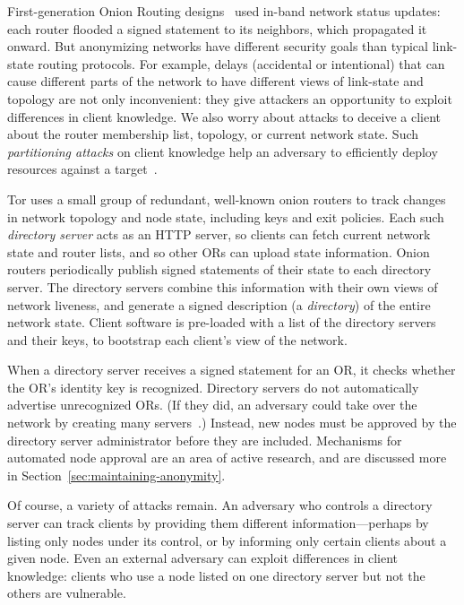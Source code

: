 \documentclass[times,10pt,twocolumn]{article}
\begin{document}
First-generation Onion Routing designs~\cite{freedom2-arch,or-jsac98} used
in-band network status updates: each router flooded a signed statement
to its neighbors, which propagated it onward. But anonymizing networks
have different security goals than typical link-state routing protocols.
For example, delays (accidental or intentional)
that can cause different parts of the network to have different views
of link-state and topology are not only inconvenient: they give
attackers an opportunity to exploit differences in client knowledge.
We also worry about attacks to deceive a
client about the router membership list, topology, or current network
state. Such \emph{partitioning attacks} on client knowledge help an
adversary to efficiently deploy resources
against a target~\cite{minion-design}.

Tor uses a small group of redundant, well-known onion routers to
track changes in network topology and node state, including keys and
exit policies.  Each such \emph{directory server} acts as an HTTP
server, so clients can fetch current network state
and router lists, and so other ORs can upload
state information.  Onion routers periodically publish signed
statements of their state to each directory server. The directory servers
combine this information with their own views of network liveness,
and generate a signed description (a \emph{directory}) of the entire
network state. Client software is
pre-loaded with a list of the directory servers and their keys,
to bootstrap each client's view of the network.

When a directory server receives a signed statement for an OR, it
checks whether the OR's identity key is recognized. Directory
servers do not automatically advertise unrecognized ORs. (If they did,
an adversary could take over the network by creating many
servers~\cite{sybil}.) Instead, new nodes must be approved by the
directory
server administrator before they are included. Mechanisms for automated
node approval are an area of active research, and are discussed more
in Section~\ref{sec:maintaining-anonymity}.

Of course, a variety of attacks remain. An adversary who controls
a directory server can track clients by providing them different
information---perhaps by listing only nodes under its control, or by
informing only certain clients about a given node. Even an external
adversary can exploit differences in client knowledge: clients who use
a node listed on one directory server but not the others are vulnerable.
\end{document}
